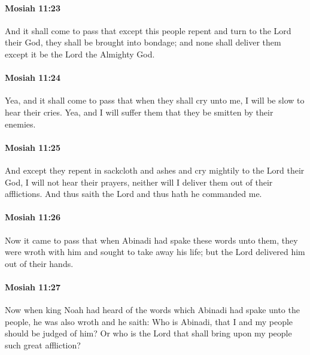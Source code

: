 		\paragraph{Mosiah 11:23} %
			\label{MOSIAH-11-23}

			And it shall come to pass that
			except this people repent and turn to the Lord their God,
			they shall be brought into bondage;
			and none shall deliver them except it be the Lord the Almighty God.

		\paragraph{Mosiah 11:24} %
			\label{MOSIAH-11-24}

			Yea, and it shall come to pass that
			when they shall cry unto me,
			I will be slow to hear their cries.
			Yea, and I will suffer them that they be smitten by their enemies.

		\paragraph{Mosiah 11:25} %
			\label{MOSIAH-11-25}

			And except they repent in sackcloth and ashes
			and cry mightily to the Lord their God,
			I will not hear their prayers,
			neither will I deliver them out of their afflictions.
			And thus saith the Lord and thus hath he commanded me.

		\paragraph{Mosiah 11:26} %
			\label{MOSIAH-11-26}

			Now it came to pass that when Abinadi had spake these words unto them,
			they were wroth with him and sought to take away his life;
			but the Lord delivered him out of their hands.

		\paragraph{Mosiah 11:27} %
			\label{MOSIAH-11-27}

			Now when king Noah had heard of the words
			which Abinadi had spake unto the people,
			he was also wroth and he saith:
			Who is Abinadi, that I and my people should be judged of him?
			Or who is the Lord that shall bring upon my people such great affliction?

